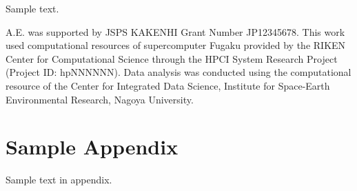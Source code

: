\documentclass[linenumbers]{aastex631}
\begin{document}
Sample text.


\begin{acknowledgments}
  A.E. was supported by JSPS KAKENHI Grant Number JP12345678.
  This work used computational resources of supercomputer Fugaku provided by the RIKEN Center for Computational Science through the HPCI System Research Project (Project ID\@: hpNNNNNN).
  Data analysis was conducted using the computational resource of the Center for Integrated Data Science, Institute for Space-Earth Environmental Research, Nagoya University.
\end{acknowledgments}

\appendix

\section{Sample Appendix\label{appendix:sample}}

Sample text in appendix.




\end{document}
